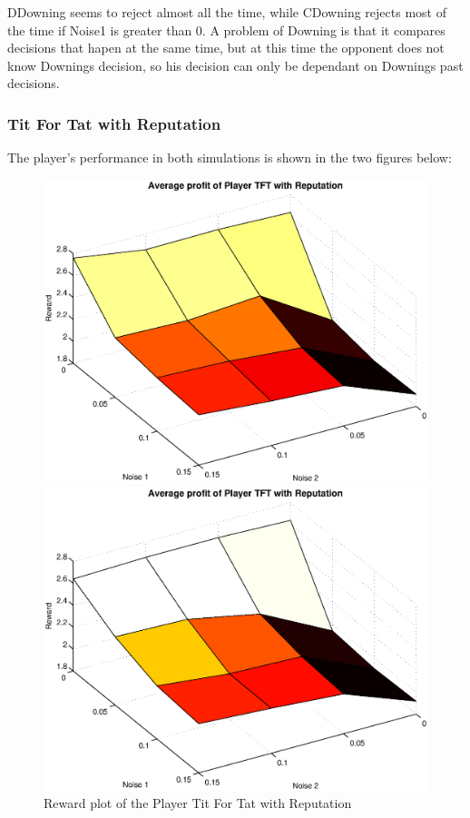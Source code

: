 DDowning seems to reject almost all the time, while CDowning rejects most of the time if Noise1 is greater than 0. A problem of Downing is that it compares decisions that hapen at the same time, but at this time the opponent does not know Downings decision, so his decision can only be dependant on Downings past decisions.

\newpage
\subsubsection{Tit For Tat with Reputation}
The player's performance in both simulations is shown in the two figures below:
\begin{figure}[h]

\begin{minipage}[hbt]{0.65\textwidth}
	\centering
	\includegraphics[width=\textwidth]{pics/simulation1/Reward_vs_Noise_of_Player_TFT_with_Reputation}
\end{minipage}
\hfill
\begin{minipage}[hbt]{0.3\textwidth}
	\centering
	\includegraphics[width=\textwidth]{pics/simulation2/Reward_vs_Noise_of_Player_TFT_with_Reputation}
\end{minipage}
	\caption{Reward plot of the Player Tit For Tat with Reputation}
	\label{pic player tftwr}
\end{figure}

